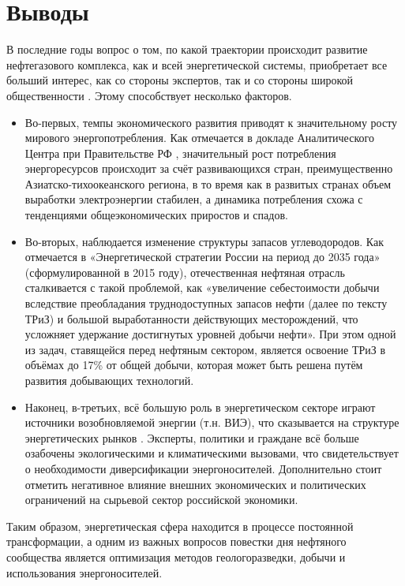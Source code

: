 \chapter{Выводы}
\label{conclusions}

В последние годы вопрос о том, по какой траектории происходит развитие нефтегазового комплекса, как и всей энергетической системы, приобретает все больший интерес, как со стороны экспертов, так и со стороны широкой общественности \cite{bakhtin2017trend,kuzminov2017global}. 
Этому способствует несколько факторов. 


\begin{itemize}
\tightlist
\item Во-первых, темпы экономического развития приводят к значительному росту мирового энергопотребления. Как отмечается в докладе Аналитического Центра при Правительстве РФ , значительный рост потребления энергоресурсов происходит за счёт развивающихся стран, преимущественно Азиатско-тихоокеанского региона, в то время как в развитых странах объем выработки электроэнергии стабилен, а динамика потребления схожа с тенденциями общеэкономических приростов и спадов. 

\item Во-вторых, наблюдается изменение структуры запасов углеводородов. Как отмечается в «Энергетической стратегии России на период до 2035 года»  (сформулированной в 2015 году), отечественная нефтяная отрасль сталкивается с такой проблемой, как «увеличение себестоимости добычи вследствие преобладания труднодоступных запасов нефти (далее по тексту ТРиЗ) и большой выработанности действующих месторождений, что усложняет удержание достигнутых уровней добычи нефти». При этом одной из задач, ставящейся перед нефтяным сектором, является освоение ТРиЗ в объёмах до 17\% от общей добычи, которая может быть решена путём развития добывающих технологий. 

\item Наконец, в-третьих, всё большую роль в энергетическом секторе играют источники возобновляемой энергии (т.н. ВИЭ), что сказывается на структуре энергетических рынков . Эксперты, политики и граждане всё больше озабочены экологическими и климатическими вызовами, что свидетельствует о необходимости диверсификации энергоносителей. Дополнительно стоит отметить негативное влияние внешних экономических и политических ограничений на сырьевой сектор российской экономики.
\end{itemize}

Таким образом, энергетическая сфера находится в процессе постоянной трансформации, а одним из важных вопросов повестки дня нефтяного сообщества является оптимизация методов геологоразведки, добычи и использования энергоносителей. 

